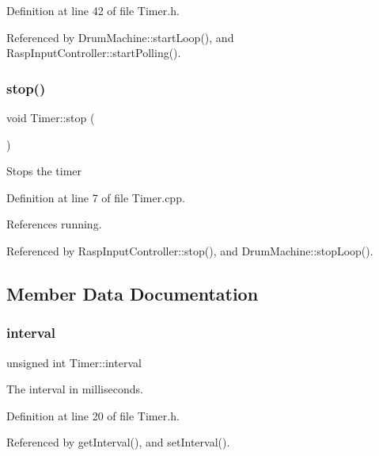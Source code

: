 Definition at line 42 of file Timer.\+h.



Referenced by Drum\+Machine\+::start\+Loop(), and Rasp\+Input\+Controller\+::start\+Polling().

\mbox{\label{class_timer_a63f0eb44b27402196590a03781515dba}} 
\subsubsection{\texorpdfstring{stop()}{stop()}}
{\footnotesize\ttfamily void Timer\+::stop (\begin{DoxyParamCaption}{ }\end{DoxyParamCaption})}

Stops the timer 

Definition at line 7 of file Timer.\+cpp.



References running.



Referenced by Rasp\+Input\+Controller\+::stop(), and Drum\+Machine\+::stop\+Loop().



\subsection{Member Data Documentation}
\mbox{\label{class_timer_aaf9bce1286b714658a0f4484d8fee960}} 
\subsubsection{\texorpdfstring{interval}{interval}}
{\footnotesize\ttfamily unsigned int Timer\+::interval\hspace{0.3cm}{\ttfamily [private]}}



The interval in milliseconds. 



Definition at line 20 of file Timer.\+h.



Referenced by get\+Interval(), and set\+Interval().

\mbox{\label{class_timer_a0eb4723e5856ae2180081af68980d1dc}} 
